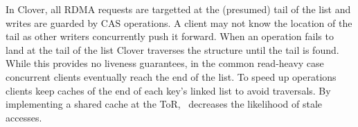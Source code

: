 In Clover, all RDMA requests
are targetted at the (presumed) tail of the list and writes are
guarded by CAS operations. A client may not know the location of the
tail as other writers concurrently push it forward. When an operation
fails to land at the tail of the list Clover traverses the
structure until the tail is found. While this provides no liveness
guarantees, in the common read-heavy case concurrent clients
eventually reach the end of the list. To speed up operations clients
keep caches of the end of each key's linked list to
avoid traversals.
By implementing a shared cache at the ToR, \sword\ 
decreases the likelihood of stale accesses.

